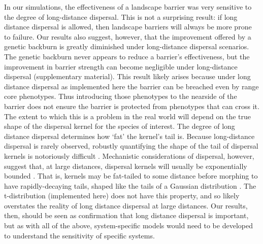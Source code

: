 \documentclass{article}
\begin{document}
In our simulations, the effectiveness of a landscape barrier was very sensitive to the degree of long-distance dispersal.  This is not a surprising result: if long distance dispersal is allowed, then landscape barriers will always be more prone to failure.  Our results also suggest, however, that the improvement offered by a genetic backburn is greatly diminished under long-distance dispersal scenarios.  The genetic backburn never appears to reduce a barrier's effectiveness, but the improvement in barrier strength can become negligible under long-distance dispersal (supplementary material).  This result likely arises because under long distance dispersal as implemented here the barrier can be breached even by range core phenotypes.  Thus introducing those phenotypes to the nearside of the barrier does not ensure the barrier is protected from phenotypes that can cross it.  The extent to which this is a problem in the real world will depend on the true shape of the dispersal kernel for the species of interest.  The degree of long distance dispersal determines how `fat' the kernel's tail is.  Because long-distance dispersal is rarely observed, robustly quantifying the shape of the tail of dispersal kernels is notoriously difficult \citep[e.g.,][]{Clark1998a}.  Mechanistic considerations of dispersal, however, suggest that, at large distances, dispersal kernels will usually be exponentially bounded \citep{Petrovskii2009a}.  That is, kernels may be fat-tailed to some distance before morphing to have rapidly-decaying tails, shaped like the tails of a Gaussian distribution \citep{Petrovskii2009a}.  The t-distribution (implemented here) does not have this property, and so likely overstates the reality of long distance dispersal at large distances.  Our results, then, should be seen as confirmation that long distance dispersal is important, but as with all of the above, system-specific models would need to be developed to understand the sensitivity of specific systems.
\end{document}
